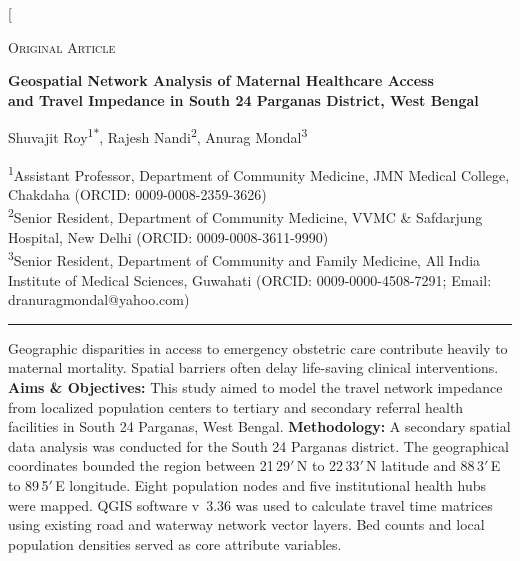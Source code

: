 \documentclass[10pt,twocolumn,letterpaper]{article}
\begin{document}
\twocolumn[{%
\begin{center}
{\large\scshape Original Article}\\[10pt]
{\fontsize{14.9}{17}\selectfont\bfseries Geospatial Network Analysis of Maternal Healthcare Access\\ and Travel Impedance in South 24 Parganas District, West Bengal\par}
\vspace{12pt}
Shuvajit Roy\textsuperscript{1$\ast$}, Rajesh Nandi\textsuperscript{2}, Anurag Mondal\textsuperscript{3}\\[8pt]
\begin{minipage}{0.86\textwidth}\footnotesize
\textsuperscript{1}Assistant Professor, Department of Community Medicine, JMN Medical College, Chakdaha (ORCID: 0009-0008-2359-3626)\\
\textsuperscript{2}Senior Resident, Department of Community Medicine, VVMC \& Safdarjung Hospital, New Delhi (ORCID: 0009-0008-3611-9990)\\
\textsuperscript{3}Senior Resident, Department of Community and Family Medicine, All India Institute of Medical Sciences, Guwahati (ORCID: 0009-0000-4508-7291; Email: dranuragmondal@yahoo.com)
\end{minipage}
\end{center}
\vspace{6pt}
\noindent\rule{\textwidth}{0.4pt}\par\vspace{6pt}
\par\vspace{2pt}
 Geographic disparities in access to emergency obstetric care contribute heavily to maternal mortality. Spatial barriers often delay life-saving clinical interventions.
{\bfseries Aims \& Objectives:} This study aimed to model the travel network impedance from localized population centers to tertiary and secondary referral health facilities in South 24 Parganas, West Bengal.
{\bfseries Methodology:} A secondary spatial data analysis was conducted for the South 24 Parganas district. The geographical coordinates bounded the region between 21\textdegree\,29$'$\,N to 22\textdegree\,33$'$\,N latitude and 88\textdegree\,3$'$\,E to 89\textdegree\,5$'$\,E longitude. Eight population nodes and five institutional health hubs were mapped. QGIS software v~3.36 was used to calculate travel time matrices using existing road and waterway network vector layers. Bed counts and local population densities served as core attribute variables.
}
\end{document}

